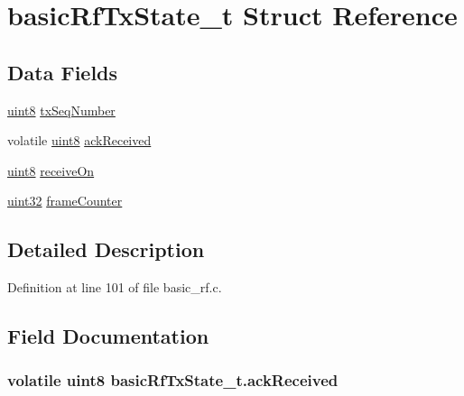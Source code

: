 \hypertarget{structbasic_rf_tx_state__t}{
\section{basicRfTxState\_\-t Struct Reference}
\label{structbasic_rf_tx_state__t}
}
\subsection*{Data Fields}
\begin{DoxyCompactItemize}
\item 
\hyperlink{hal__types_8h_adde6aaee8457bee49c2a92621fe22b79}{uint8} \hyperlink{structbasic_rf_tx_state__t_afeacb6ece372c19b18198fda274b3bdb}{txSeqNumber}
\item 
volatile \hyperlink{hal__types_8h_adde6aaee8457bee49c2a92621fe22b79}{uint8} \hyperlink{structbasic_rf_tx_state__t_a83c76da0b55029bcffb2f2f9db9976a0}{ackReceived}
\item 
\hyperlink{hal__types_8h_adde6aaee8457bee49c2a92621fe22b79}{uint8} \hyperlink{structbasic_rf_tx_state__t_ae9ea1758c5ff0649f4dacecbc6526ded}{receiveOn}
\item 
\hyperlink{hal__types_8h_a4b435a49c74bb91f284f075e63416cb6}{uint32} \hyperlink{structbasic_rf_tx_state__t_aaa2d41a209294093ad7c03b13c71df50}{frameCounter}
\end{DoxyCompactItemize}


\subsection{Detailed Description}


Definition at line 101 of file basic\_\-rf.c.



\subsection{Field Documentation}
\hypertarget{structbasic_rf_tx_state__t_a83c76da0b55029bcffb2f2f9db9976a0}{
\subsubsection[{ackReceived}]{\setlength{\rightskip}{0pt plus 5cm}volatile {\bf uint8} {\bf basicRfTxState\_\-t.ackReceived}}}
\label{structbasic_rf_tx_state__t_a83c76da0b55029bcffb2f2f9db9976a0}


